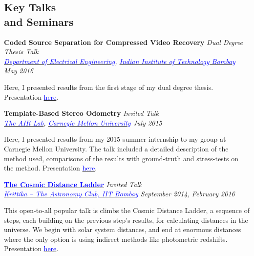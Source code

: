 \documentclass[margin,line]{res}
\newenvironment{list1}{
  \begin{list}{\ding{113}}{%
      \setlength{\itemsep}{0in}
      \setlength{\parsep}{0in} \setlength{\parskip}{0in}
      \setlength{\topsep}{0in} \setlength{\partopsep}{0in} 
      \setlength{\leftmargin}{0.17in}}}{\end{list}}
\begin{document}
\begin{resume}
\section{\sc Key Talks \\ and Seminars}
{\bf Coded Source Separation for Compressed Video Recovery} \hfill {\em Dual Degree Thesis Talk} \\
{\em \href{http://www.ee.iitb.ac.in/}{\textcolor{blue}{Department of Electrical Engineering}}, \href{http://www.iitb.ac.in/}{\textcolor{blue}{Indian Institute of Technology Bombay}} \hfill May 2016} \\
\vspace*{-.15in}
\begin{list1}
\item[] Here, I presented results from the first stage of my dual degree thesis. Presentation \href{http://alankarkotwal.github.io/sre.pptx}{\textcolor{blue} {here}}.
\end{list1}

\vspace*{-0.1in}

{\bf Template-Based Stereo Odometry} \hfill {\em Invited Talk} \\
{\em \href{http://theairlab.org/}{\textcolor{blue}{The AIR Lab}}, \href{http://www.cmu.edu/}{\textcolor{blue}{Carnegie Mellon University}} \hfill July 2015} \\
\vspace*{-.15in}
\begin{list1}
\item[] Here, I presented results from my 2015 summer internship to my group at Carnegie Mellon University. The talk included a detailed description of the method used, comparisons of the results with ground-truth and stress-tests on the method. Presentation \href{http://alankarkotwal.github.io/intern_presentation.pptx}{\textcolor{blue} {here}}.
\end{list1}

\vspace*{-0.1in}

{\bf \href{http://www.stab-iitb.org/krittika/the-cosmic-ladder-distance}{\textcolor{blue} {The Cosmic Distance Ladder}}} \hfill {\em Invited Talk} \\
{\em \href{http://www.stab-iitb.org/krittika/}{\textcolor{blue} {Krittika -- The Astronomy Club, IIT Bombay}} \hfill September 2014, February 2016} \\
\vspace*{-.15in}
\begin{list1}
\item[] This open-to-all popular talk is climbs the Cosmic Distance Ladder, a sequence of steps, each building on the previous step's results, for calculating distances in the universe. We begin with solar system distances, and end at enormous distances where the only option is using indirect methods like photometric redshifts. Presentation \href{http://alankarkotwal.github.io/CosmicDistanceLadder.pptx}{\textcolor{blue} {here}}.
\end{list1}


\end{resume}
\end{document}
